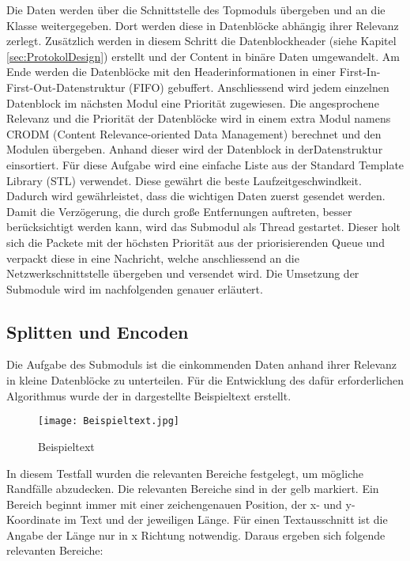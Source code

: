 Die Daten werden über die Schnittstelle des Topmoduls übergeben und an die
Klasse  weitergegeben. Dort werden diese in Datenblöcke
abhängig ihrer Relevanz zerlegt. Zusätzlich werden in diesem Schritt die
Datenblockheader (siehe Kapitel \ref{sec:ProtokolDesign}) erstellt und der
Content in binäre Daten umgewandelt. Am Ende werden die Datenblöcke mit den
Headerinformationen in einer First-In-First-Out-Datenstruktur (FIFO)
gebuffert.
Anschliessend wird jedem einzelnen Datenblock im nächsten Modul eine Priorität zugewiesen. Die angesprochene
Relevanz und die Priorität der Datenblöcke wird in einem extra Modul namens
CRODM (Content Relevance-oriented Data Management)
berechnet und den Modulen übergeben.
Anhand dieser wird der Datenblock in derDatenstruktur
 einsortiert. Für diese Aufgabe wird eine einfache
Liste aus der Standard Template Library (STL) verwendet.
Diese gewährt die beste Laufzeitgeschwindkeit. Dadurch wird gewährleistet, dass die wichtigen
Daten zuerst gesendet werden.
Damit die Verzögerung, die durch große Entfernungen auftreten, besser
berücksichtigt werden kann, wird das Submodul  als Thread
gestartet.
Dieser holt sich die Packete mit der höchsten Priorität aus der priorisierenden Queue
und verpackt diese in eine Nachricht, welche anschliessend an die
Netzwerkschnittstelle übergeben und versendet wird. \newline
Die Umsetzung der Submodule wird im nachfolgenden genauer erläutert.

\subsection{Splitten und Encoden}

Die Aufgabe des Submoduls  ist die einkommenden Daten
anhand ihrer Relevanz in kleine Datenblöcke zu unterteilen. Für die Entwicklung
des dafür erforderlichen Algorithmus wurde der in 
dargestellte Beispieltext erstellt.

\begin{figure}[H]
\centering
\texttt{[image: Beispieltext.jpg]} %
\caption{Beispieltext}
\label{fig:Beispieltext}
\end{figure}

In diesem Testfall wurden die relevanten Bereiche festgelegt, um mögliche
Randfälle abzudecken. Die relevanten Bereiche sind in
der  gelb markiert.
Ein Bereich beginnt immer mit einer zeichengenauen Position, der x- und
y-Koordinate im Text und der jeweiligen Länge. Für einen Textausschnitt ist die
Angabe der Länge nur in x Richtung notwendig. \newline
Daraus ergeben sich folgende relevanten Bereiche:

